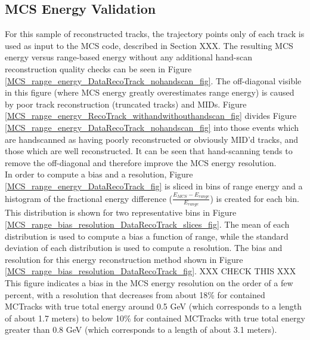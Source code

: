 \subsection{MCS Energy Validation}\label{MCS_Energy_Validation_DataRecoTrack_section}
For this sample of reconstructed tracks, the trajectory points only of each track is used as input to the MCS code, described in Section XXX. The resulting MCS energy versus range-based energy without any additional hand-scan reconstruction quality checks can be seen in Figure \ref{MCS_range_energy_DataRecoTrack_nohandscan_fig}. The off-diagonal visible in this figure (where MCS energy greatly overestimates range energy) is caused by poor track reconstruction (truncated tracks) and MIDs. Figure \ref{MCS_range_energy_RecoTrack_withandwithouthandscan_fig} divides Figure \ref{MCS_range_energy_DataRecoTrack_nohandscan_fig} into those events which are handscanned as having poorly reconstructed or obviously MID'd tracks, and those which are well reconstructed. It can be seen that hand-scanning tends to remove the off-diagonal and therefore improve the MCS energy resolution.\\

In order to compute a bias and a resolution, Figure \ref{MCS_range_energy_DataRecoTrack_fig} is sliced in bins of range energy and a histogram of the fractional energy difference ($\frac{E_{MCS} - E_{range}}{E_{range}}$) is created for each bin. This distribution is shown for two representative bins in Figure \ref{MCS_range_bias_resolution_DataRecoTrack_slices_fig}. The mean of each distribution is used to compute a bias a function of range, while the standard deviation of each distribution is used to compute a resolution. The bias and resolution for this energy reconstruction method shown in Figure \ref{MCS_range_bias_resolution_DataRecoTrack_fig}. XXX CHECK THIS XXX This figure indicates a bias in the MCS energy resolution on the order of a few percent, with a resolution that decreases from about 18\% for contained {\sc MCTracks} with true total energy around 0.5 GeV (which corresponds to a length of about 1.7 meters) to below 10\% for contained {\sc MCTracks} with true total energy greater than 0.8 GeV (which corresponds to a length of about 3.1 meters).


